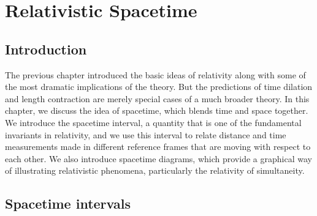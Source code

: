 \chapter{Relativistic Spacetime}
\label{chapter:relativistic_spacetime}


\section{Introduction}


The previous chapter introduced the basic ideas of relativity along
with some of the most dramatic implications of the theory.  But the
predictions of time dilation and length contraction are merely special
cases of a much broader theory.  In this chapter, we discuss the idea
of spacetime, which blends time and space together.  We introduce the
spacetime interval, a quantity that is one of the fundamental
invariants in relativity, and we use this interval to relate distance
and time measurements made in different reference frames that 
are moving with respect to each other.  We also introduce
spacetime diagrams, which provide a graphical way of illustrating
relativistic phenomena, particularly the relativity of simultaneity.
    

\section{Spacetime intervals}

